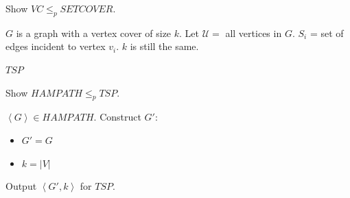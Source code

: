 \documentclass[10pt,landscape,a4paper]{article}
\newcommand{\abs}[1]{\left | #1 \right |}
\newcommand{\encoding}[1]{\left \langle #1 \right \rangle}
\begin{document}
\begin{multicols*}{3}
Show $VC \leq_p SETCOVER$.

$G$ is a graph with a vertex cover of size $k$. Let $\mathcal{U} =$ all vertices in $G$. $S_i$ = set of edges incident to vertex $v_i$. $k$ is still the same.

\underline{$TSP$}

Show $HAMPATH \leq_p TSP$.

$\encoding{G} \in HAMPATH$. Construct $G'$:

\begin{itemize}
    \item $G' = G$
    \item $k = \abs{V}$
\end{itemize}

Output $\encoding{G', k}$ for $TSP$.

\end{multicols*}
\end{document}
